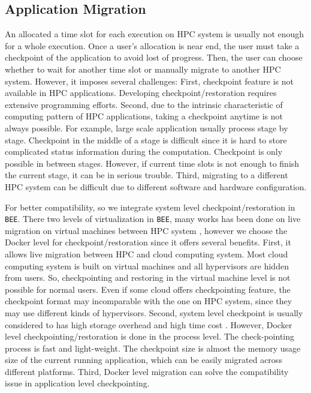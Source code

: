 \subsection{Application Migration}
An allocated a time slot for each execution on HPC system is usually not enough for a whole execution. Once a user's allocation is near end, the user must take a checkpoint of the application to avoid lost of progress. Then, the user can choose whether to wait for another time slot or manually migrate to another HPC system. However, it imposes several challenges: First, checkpoint feature is not available in HPC applications. Developing checkpoint/restoration requires extensive programming efforts. Second, due to the intrinsic characteristic of computing pattern of HPC applications, taking a checkpoint anytime is not always possible. For example, large scale application usually process stage by stage. Checkpoint in the middle of a stage is difficult since it is hard to store complicated status information during the computation. Checkpoint is only possible in between stages. However, if current time slots is not enough to finish the current stage, it can be in serious trouble. Third, migrating to a different HPC system can be difficult due to different software and hardware configuration. 

For better compatibility, so we integrate system level checkpoint/restoration in \texttt{BEE}. There two levels of virtualization in \texttt{BEE}, many works has been done on live migration on virtual machines between HPC system \cite{huang2007high, anedda2010suspending}, however we choose the Docker level for checkpoint/restoration since it offers several benefits. First, it allows live migration between HPC and cloud computing system. Most cloud computing system is built on virtual machines and all hypervisors are hidden from users. So, checkpointing and restoring in the virtual machine level is not possible for normal users. Even if some cloud offers checkpointing feature, the checkpoint format may incomparable with the one on HPC system, since they may use different kinds of hypervisors. Second, system level checkpoint is usually considered to has high storage overhead and high time cost \cite{voorsluys2009cost}. However, Docker level checkpointing/restoration \cite{criu} is done in the process level. The check-pointing process is fast and light-weight. The checkpoint size is almost the memory usage size of the current running application, which can be easily migrated across different platforms. Third, Docker level migration can solve the compatibility issue in application level checkpointing.
